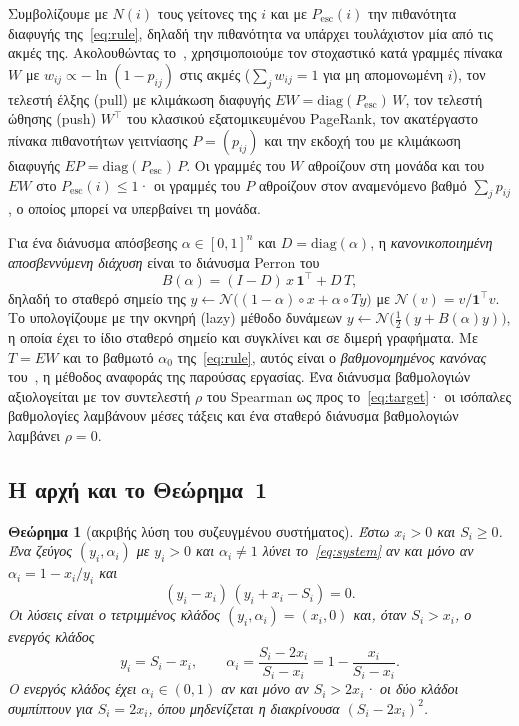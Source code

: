 \documentclass[11pt,a4paper]{article}
\newtheorem{theorem}{Θεώρημα}
\theoremstyle{definition}
\theoremstyle{plain}
\newcommand{\Pesc}{P_{\mathrm{esc}}}
\newcommand{\diag}{\mathrm{diag}}
\newcommand{\N}{\mathcal{N}}
\newcommand{\one}{\mathbf{1}}
\begin{document}
Συμβολίζουμε με $N(i)$ τους γείτονες της $i$ και με $\Pesc(i)$ την πιθανότητα διαφυγής της~\eqref{eq:rule}, δηλαδή την πιθανότητα να υπάρχει τουλάχιστον μία από τις ακμές της. Ακολουθώντας το~\cite{konstantellos26}, χρησιμοποιούμε τον στοχαστικό κατά γραμμές πίνακα $W$ με $w_{ij}\propto-\ln(1-p_{ij})$ στις ακμές ($\sum_jw_{ij}=1$ για μη απομονωμένη $i$), τον τελεστή έλξης (pull) με κλιμάκωση διαφυγής $EW=\diag(\Pesc)\,W$, τον τελεστή ώθησης (push) $W^{\top}$ του κλασικού εξατομικευμένου PageRank, τον ακατέργαστο πίνακα πιθανοτήτων γειτνίασης $P=(p_{ij})$ και την εκδοχή του με κλιμάκωση διαφυγής $EP=\diag(\Pesc)\,P$. Οι γραμμές του $W$ αθροίζουν στη μονάδα και του $EW$ στο $\Pesc(i)\le1$· οι γραμμές του $P$ αθροίζουν στον αναμενόμενο βαθμό $\sum_jp_{ij}$, ο οποίος μπορεί να υπερβαίνει τη μονάδα.

Για ένα διάνυσμα απόσβεσης $\alpha\in[0,1]^n$ και $D=\diag(\alpha)$, η \emph{κανονικοποιημένη αποσβεννύμενη διάχυση} είναι το διάνυσμα Perron του
\begin{equation}\label{eq:diffusion}
B(\alpha)=(I-D)\,x\,\one^{\top}+D\,T,
\end{equation}
δηλαδή το σταθερό σημείο της $y\leftarrow\N\big((1-\alpha)\circ x+\alpha\circ Ty\big)$ με $\N(v)=v/\one^{\top}v$. Το υπολογίζουμε με την οκνηρή (lazy) μέθοδο δυνάμεων $y\leftarrow\N\big(\tfrac12(y+B(\alpha)y)\big)$, η οποία έχει το ίδιο σταθερό σημείο και συγκλίνει και σε διμερή γραφήματα. Με $T=EW$ και το βαθμωτό $\alpha_0$ της~\eqref{eq:rule}, αυτός είναι ο \emph{βαθμονομημένος κανόνας} του~\cite{konstantellos26}, η μέθοδος αναφοράς της παρούσας εργασίας. Ένα διάνυσμα βαθμολογιών αξιολογείται με τον συντελεστή $\rho$ του Spearman ως προς το~\eqref{eq:target}· οι ισόπαλες βαθμολογίες λαμβάνουν μέσες τάξεις και ένα σταθερό διάνυσμα βαθμολογιών λαμβάνει $\rho=0$.

\subsection{Η αρχή και το Θεώρημα~1}\label{sec:theorem}

\begin{theorem}[ακριβής λύση του συζευγμένου συστήματος]\label{thm:factor}
Έστω $x_i>0$ και $S_i\ge0$. Ένα ζεύγος $(y_i,\alpha_i)$ με $y_i>0$ και $\alpha_i\neq1$ λύνει το~\eqref{eq:system} αν και μόνο αν $\alpha_i=1-x_i/y_i$ και
\begin{equation}\label{eq:factor}
(y_i-x_i)\,(y_i+x_i-S_i)=0 .
\end{equation}
Οι λύσεις είναι ο τετριμμένος κλάδος $(y_i,\alpha_i)=(x_i,0)$ και, όταν $S_i>x_i$, ο ενεργός κλάδος
\begin{equation}\label{eq:active}
y_i=S_i-x_i,\qquad \alpha_i=\frac{S_i-2x_i}{S_i-x_i}=1-\frac{x_i}{S_i-x_i}.
\end{equation}
Ο ενεργός κλάδος έχει $\alpha_i\in(0,1)$ αν και μόνο αν $S_i>2x_i$· οι δύο κλάδοι συμπίπτουν για $S_i=2x_i$, όπου μηδενίζεται η διακρίνουσα $(S_i-2x_i)^2$.
\end{theorem}
\end{document}
